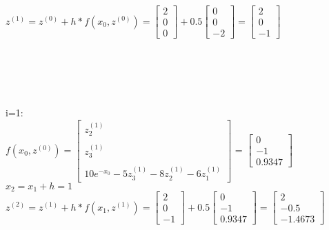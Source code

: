\documentclass[../ZF_HM2.tex]{subfiles}
\begin{document}
\begin{mdframed}
\colorbox{blue!30}{$z^{(1)}= z^{(0)} + h *f(x_0,z^{(0)}) = \left[\begin{matrix}
2\\
0\\
0
\end{matrix} \right] + 0.5\left[\begin{matrix}
0\\
0\\
-2
\end{matrix} \right]= \left[\begin{matrix}
2\\
0\\
-1
\end{matrix} \right]$}\\\\\\\\\\\\
\colorbox{violet!30}{i=1:}\\
 $f(x_0,z^{(0)})=\left[\begin{matrix}
z_2^{(1)}\\\\
z_3^{(1)}\\\\
10e^{-x_0}-5z_3^{(1)}-8z_2^{(1)}-6z_1^{(1)}
\end{matrix}\right]$ = $\left[\begin{matrix}
0\\
-1\\
0.9347
\end{matrix} \right]$\\
\colorbox{blue!30}{$x_2= x_1 + h = 1$}\\
\colorbox{blue!30}{$z^{(2)}= z^{(1)} + h *f(x_1,z^{(1)}) = \left[\begin{matrix}
2\\
0\\
-1
\end{matrix} \right] + 0.5\left[\begin{matrix}
0\\
-1\\
0.9347
\end{matrix} \right]= \left[\begin{matrix}
2\\
-0.5\\
-1.4673
\end{matrix} \right]$}\\\\
\end{mdframed}
\end{document}
